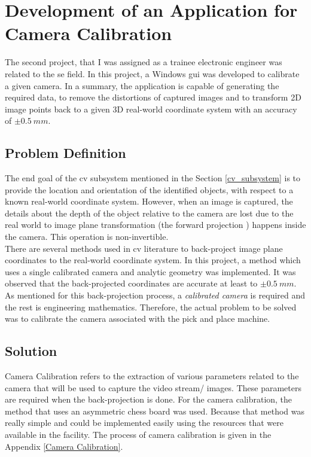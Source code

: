 \documentclass[a4paper,12pt]{report}%
\begin{document}
\section{Development of an Application for Camera Calibration}
\label{Development of an Application for Camera Calibration}
The second project, that I was assigned as a trainee electronic engineer was related to the \ac{se} field. In this project, a Windows \ac{gui} was developed to calibrate a given camera. In a summary, the application is capable of generating the required data, to remove the distortions of captured images and to transform 2D image points back to a given 3D real-world coordinate system with an accuracy of $\pm 0.5 ~mm$.

\subsection{Problem Definition}

The end goal of the \ac{cv} subsystem mentioned in the Section \ref{cv_subsystem} is to provide the location and orientation of the identified objects, with respect to a known real-world coordinate system. However, when an image is captured, the details about the depth of the object relative to the camera are lost due to the real world to image plane transformation (the forward projection \cite{hartley_zisserman_2004}) happens inside the camera. This operation is non-invertible.\\

There are several methods used in \ac{cv}  literature to back-project image plane coordinates to the real-world coordinate system. In this project, a method which uses a single calibrated camera and analytic geometry was implemented. It was observed that the back-projected coordinates are accurate at least to $\pm 0.5 ~mm$. As mentioned for this back-projection process, a \textit{calibrated camera} is required and the rest is engineering mathematics. Therefore, the actual problem to be solved was to calibrate the camera associated with the pick and place machine.



\subsection{Solution}
Camera Calibration refers to the extraction of various parameters related to the camera that will be used to capture the video stream/ images. These parameters are required when the back-projection is done. For the camera calibration, the method that uses an asymmetric chess board was used\cite{cam_calib:_nodate}. Because that method was really simple and could be implemented easily using the resources that were available in the facility. The process of camera calibration is given in the Appendix \ref{Camera Calibration}.\\
\end{document}
